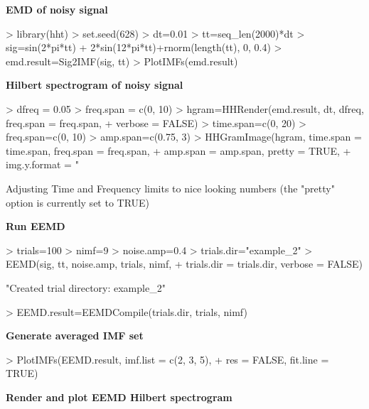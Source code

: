 \documentclass[12pt]{article}
\begin{document}
\textbf{EMD of noisy signal}
\begin{Schunk}
\begin{Sinput}
> library(hht)
> set.seed(628)
> dt=0.01
> tt=seq_len(2000)*dt
> sig=sin(2*pi*tt) + 2*sin(12*pi*tt)+rnorm(length(tt), 0, 0.4)
> emd.result=Sig2IMF(sig, tt)
> PlotIMFs(emd.result)
\end{Sinput}
\end{Schunk}


\textbf{Hilbert spectrogram of noisy signal}
\begin{Schunk}
\begin{Sinput}
> dfreq = 0.05
> freq.span = c(0, 10)
> hgram=HHRender(emd.result, dt, dfreq, freq.span = freq.span, 
+     verbose = FALSE)
> time.span=c(0, 20)
> freq.span=c(0, 10)
> amp.span=c(0.75, 3)
> HHGramImage(hgram, time.span = time.span, freq.span = freq.span,
+     amp.span = amp.span, pretty = TRUE,
+     img.y.format = "%.0f", img.x.format = "%.0f")
\end{Sinput}
\begin{Soutput}
Adjusting Time and Frequency limits to nice looking numbers (the "pretty" option is currently set to TRUE)
\end{Soutput}
\end{Schunk}

\textbf{Run EEMD}

\begin{Schunk}
\begin{Sinput}
> trials=100
> nimf=9
> noise.amp=0.4
> trials.dir="example_2"
> EEMD(sig, tt, noise.amp, trials, nimf, 
+     trials.dir = trials.dir, verbose = FALSE)
\end{Sinput}
\begin{Soutput}
[1] "Created trial directory: example_2"
\end{Soutput}
\begin{Sinput}
> EEMD.result=EEMDCompile(trials.dir, trials, nimf)
\end{Sinput}
\end{Schunk}

\textbf{Generate averaged IMF set}

\begin{Schunk}
\begin{Sinput}
> PlotIMFs(EEMD.result, imf.list = c(2, 3, 5),
+     res = FALSE, fit.line = TRUE)
\end{Sinput}
\end{Schunk}

\textbf{Render and plot EEMD Hilbert spectrogram}
\end{document}
